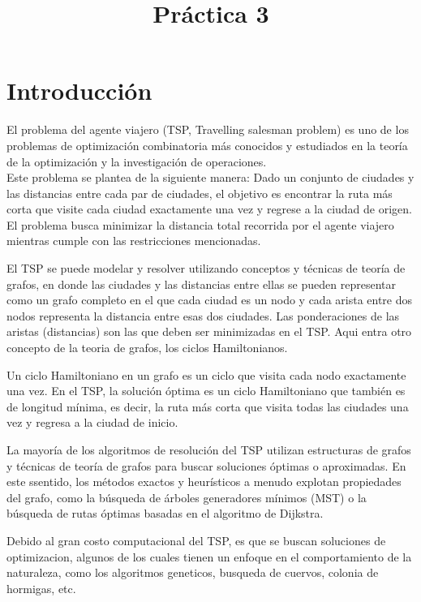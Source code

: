 \documentclass[]{report}
\title{Práctica 3}
\author{}
\begin{document}
\maketitle
	
	\begin{abstract}
		
	\end{abstract}
	\section{Introducción}
	El problema del agente viajero (TSP, Travelling salesman problem) es uno de los problemas de optimización combinatoria más conocidos y estudiados en la teoría de la optimización y la investigación de operaciones.\\
	Este problema se plantea de la siguiente manera: Dado un conjunto de ciudades y las distancias entre cada par de ciudades, el objetivo es encontrar la ruta más corta que visite cada ciudad exactamente una vez y regrese a la ciudad de origen. El problema busca minimizar la distancia total recorrida por el agente viajero mientras cumple con las restricciones mencionadas.
	
	El TSP se puede modelar y resolver utilizando conceptos y técnicas de teoría de grafos, en donde las ciudades y las distancias entre ellas se pueden representar como un grafo completo en el que cada ciudad es un nodo y cada arista entre dos nodos representa la distancia entre esas dos ciudades. Las ponderaciones de las aristas (distancias) son las que deben ser minimizadas en el TSP. Aqui entra otro concepto de la teoria de grafos, los ciclos Hamiltonianos.
	
	Un ciclo Hamiltoniano en un grafo es un ciclo que visita cada nodo exactamente una vez. En el TSP, la solución óptima es un ciclo Hamiltoniano que también es de longitud mínima, es decir, la ruta más corta que visita todas las ciudades una vez y regresa a la ciudad de inicio.
	
	La mayoría de los algoritmos de resolución del TSP utilizan estructuras de grafos y técnicas de teoría de grafos para buscar soluciones óptimas o aproximadas. En este ssentido, los métodos exactos y heurísticos a menudo explotan propiedades del grafo, como la búsqueda de árboles generadores mínimos (MST) o la búsqueda de rutas óptimas basadas en el algoritmo de Dijkstra.
	
	Debido al gran costo computacional del TSP, es que se buscan soluciones de optimizacion, algunos de los cuales tienen un enfoque en el comportamiento de la naturaleza, como los algoritmos geneticos, busqueda de cuervos, colonia de hormigas, etc.
	
\end{document}
